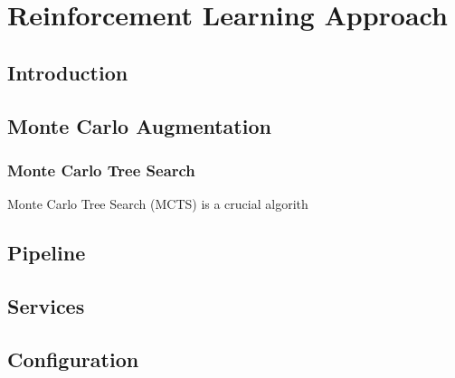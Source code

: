 \chapter{Reinforcement Learning Approach}
\section{Introduction}

\section{Monte Carlo Augmentation}
\subsection{Monte Carlo Tree Search}
Monte Carlo Tree Search (MCTS) is a crucial algorith \cite{MCTS}
\section{Pipeline}
\section{Services}
\section{Configuration}
